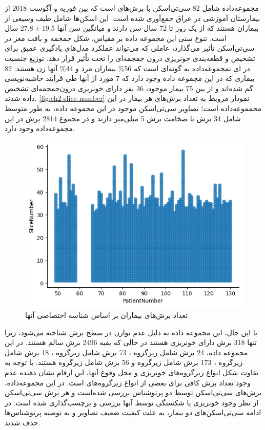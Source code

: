 مجموعه‌داده 
 شامل 82 سی‌تی‌اسکن با برش‌‌های 
است که بین فوریه و آگوست 2018 از بیمارستان آموزشی 
 در عراق جمع‌آوری شده است. این اسکن‌ها شامل طیف وسیعی از بیماران هستند که از یک روز تا 72 سال سن دارند و میانگین سن آنها 
 $27.8 \pm 19.5$
 سال است. تنوع سنی این مجموعه داده بر مقیاس، شکل جمجمه و بافت مغز در سی‌تی‌اسکن تأثیر می‌گذارد، عاملی که می‌تواند عملکرد مدل‌های یادگیری عمیق برای تشخیص و قطعه‌بندی خونریزی درون جمجمه‌ای را تحت تأثیر قرار دهد. توزیع جنسیت در ای نمجموعه‌داده به گونه‌ای است که 56\%  بیماران مرد و 44\% آنها زن هستند.
82 بیماری که در این مجموعه داده وجود دارد که 7 مورد از آنها طی قرایند حاشیه‌نویسی گم شده‌اند و از بین 75 بیمار موجود، 36 نفر دارای خونریزی درون‌جمجمه‌ای تشخیص داده شدند.
\autoref{fig:ch2-slice-number}
نمودار مروبط به تعداد برش‌های هر بیمار در این مجمموعه‌داده است؛ تصاویر سی‌تی‌اسکن موجود در این مجموعه داده،  به طور متوسط شامل 34 برش با ضخامت برش 5 میلی‌متر دارند و در مجموع 2814 برش در این مجموعه‌داده وجود دارد. 
\begin{figure}[h]
\centering
\includegraphics[width=1.0\linewidth]{"Images/Chapter2/Slice number"}
\caption{‌تعداد برش‌های بیماران بر اساس شناسه اختصاصی آنها}
\label{fig:ch2-slice-number}
\end{figure}

با این حال، این مجموعه داده به دلیل عدم توازن در سطح برش شناخته می‌شود، زیرا تنها 318 برش دارای خونریزی هستند در حالی که بقیه 2496 برش سالم هستند. در این مجموعه داده، 24 برش شامل زیرگروه
 ،
  73 برش شامل زیرگروه
 ، 
  18 برش شامل زیرگروه
 ،
173 برش شامل زیرگروه
 و 56 برش شامل زیرگروه 
هستند. با توجه به تفاوت شکل انواع زیرگروه‌های خونریزی و محل وقوع آنها، این ارقام نشان دهنده عدم وجود تعداد برش کافی برای بعضی از انواع زیرگروه‌های است.
در این مجموعه‌داده، برش‌های سی‌تی‌اسکن توسط دو پرتوشناس بررسی شده‌است و هر برش سی‌تی‌اسکن از نظر وجود خونریزی یا شکستگی توسط آنها بررسی و برچسب‌گذاری شده است. در ادامه سی‌تی‌اسکن‌های دو بیمار، به علت کیفیت ضعیف تصاویر و به توصیه پرتوشناس‌ها حذف شدند\cite{kyung2022improved}.

